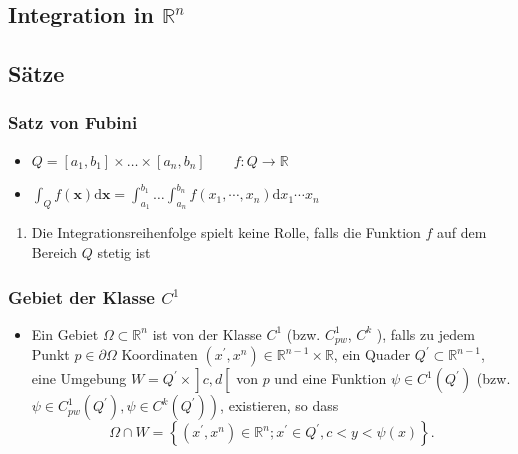 \documentclass[a3paper, 11pt, landscape]{scrartcl}
\newcommand{\Rn}{\mathbb{R}^n}
\begin{document}
\begin{multicols*}{3}
	
	\section{Integration in $\Rn$}
	\subsection{Sätze}
	\subsubsection{Satz von Fubini}
	\begin{itemize}
	    \item $Q=[a_1, b_1]\times \dots \times [a_n, b_n] \quad \quad f: Q \rightarrow \mathbb{R}$
	    \item $\int_{Q}f(\textbf{x})\text{d}\textbf{x}=\int_{a_1}^{b_1}\dots \int_{a_n}^{b_n}f(x_1, \cdots, x_n)\text{d}x_1 \cdots x_n$
	\end{itemize}
	\begin{enumerate}
	    \item Die Integrationsreihenfolge spielt keine Rolle, falls die Funktion $f$ auf dem Bereich $Q$ stetig ist
	\end{enumerate}
	
	\subsubsection{Gebiet der Klasse $C^1$}
	\begin{itemize}
	    \item Ein Gebiet $\Omega \subset \mathbb{R}^{n}$ ist von der Klasse $C^{1}$ (bzw. $C_{p w}^{1}$, $C^{k}$ ), falls zu jedem Punkt $p \in \partial \Omega$ Koordinaten $\left(x^{\prime}, x^{n}\right) \in \mathbb{R}^{n-1} \times \mathbb{R}$, ein Quader $Q^{\prime} \subset \mathbb{R}^{n-1}$, eine Umgebung $\left.W=Q^{\prime} \times\right] c, d\left[\right.$ von $p$ und eine Funktion $\psi \in C^{1}\left(Q^{\prime}\right)$
(bzw. $\left.\psi \in C_{p w}^{1}\left(Q^{\prime}\right), \psi \in C^{k}\left(Q^{\prime}\right)\right)$, existieren, so dass
$$
\Omega \cap W=\left\{\left(x^{\prime}, x^{n}\right) \in \mathbb{R}^{n} ; x^{\prime} \in Q^{\prime}, c<y<\psi(x)\right\} .
$$
	\end{itemize}
	

\end{multicols*}
\end{document}
